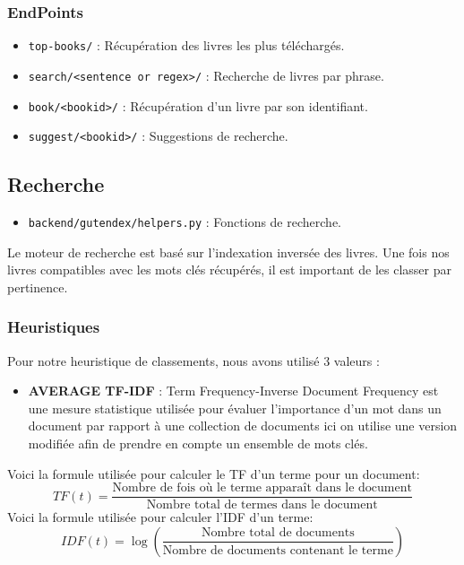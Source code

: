 \subsubsection{EndPoints}\label{endpoints}

\begin{itemize}
\tightlist
\item
  \texttt{top-books/} : Récupération des livres les plus téléchargés.
\item
  \texttt{search/\textless{}sentence\ or\ regex\textgreater{}/} :
  Recherche de livres par phrase.
\item
  \texttt{book/\textless{}bookid\textgreater{}/} : Récupération d'un
  livre par son identifiant.
\item
  \texttt{suggest/\textless{}bookid\textgreater{}/} : Suggestions de
  recherche.
\end{itemize}

\subsection{Recherche}\label{recherche}

\begin{itemize}
\tightlist
\item
  \texttt{backend/gutendex/helpers.py} : Fonctions de recherche.
\end{itemize}

Le moteur de recherche est basé sur l'indexation inversée des livres.
Une fois nos livres compatibles avec les mots clés récupérés, il est
important de les classer par pertinence.

\subsubsection{Heuristiques}\label{heuristiques}

Pour notre heuristique de classements, nous avons utilisé 3 valeurs :

\begin{itemize}
\tightlist
\item
  \textbf{AVERAGE TF-IDF} : Term Frequency-Inverse Document Frequency
  est une mesure statistique utilisée pour évaluer l'importance d'un mot
  dans un document par rapport à une collection de documents ici on
  utilise une version modifiée afin de prendre en compte un ensemble de
  mots clés.
\end{itemize}

Voici la formule utilisée pour calculer le TF d'un terme pour un
document:
\[TF(t) = \frac{\text{Nombre de fois où le terme apparaît dans le document}}{\text{Nombre total de termes dans le document}}\]
Voici la formule utilisée pour calculer l'IDF d'un terme:
\[IDF(t) = \log\left(\frac{\text{Nombre total de documents}}{\text{Nombre de documents contenant le terme}}\right)\]

